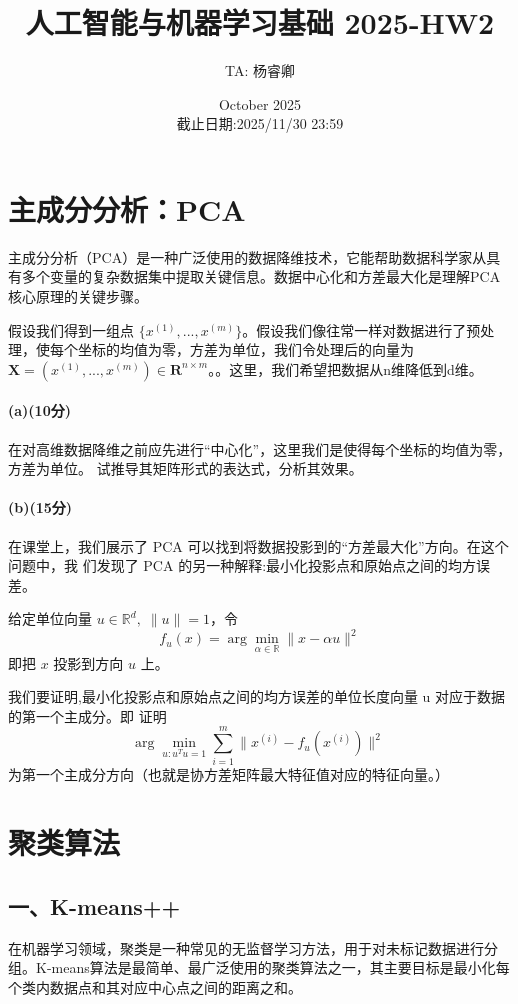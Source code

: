 \documentclass[12pt,a4paper]{article}%
\title{人工智能与机器学习基础 2025-HW2}
\author{TA: 杨睿卿}
\date{October 2025\\截止日期:2025/11/30 23:59}
\begin{document}
\maketitle
\section{主成分分析：PCA}
主成分分析（PCA）是一种广泛使用的数据降维技术，它能帮助数据科学家从具有多个变量的复杂数据集中提取关键信息。数据中心化和方差最大化是理解PCA核心原理的关键步骤。

假设我们得到一组点 $\{x^{(1)}, . . . , x^{(m)}\}$。假设我们像往常一样对数据进行了预处理，使每个坐标的均值为零，方差为单位，我们令处理后的向量为$\textbf{X}=(x^{(1)}, . . . , x^{(m)})\in \mathbf{R}^{n\times m}$。。这里，我们希望把数据从n维降低到d维。

\paragraph*{(a)(10分)}
在对高维数据降维之前应先进行“中心化”，这里我们是使得每个坐标的均值为零，方差为单位。
试推导其矩阵形式的表达式，分析其效果。

\paragraph*{(b)(15分)}
 在课堂上，我们展示了 PCA 可以找到将数据投影到的“方差最大化”方向。在这个问题中，我
们发现了 PCA 的另一种解释:最小化投影点和原始点之间的均方误差。

给定单位向量 \(u\in\mathbb{R}^{d},\;\|u\|=1\)，令  
\[
f_{u}(x)=\arg\min_{\alpha\in\mathbb{R}}\|x-\alpha u\|^{2}
\]  
即把 \(x\) 投影到方向 \(u\) 上。  

我们要证明,最小化投影点和原始点之间的均方误差的单位长度向量 u 对应于数据的第一个主成分。即
证明 
\[
\;\arg\min_{u:u^Tu=1}\sum_{i=1}^{m}\bigl\|x^{(i)}-f_{u}(x^{(i)})\bigr\|^{2}\;\;
\]  
为第一个主成分方向（也就是协方差矩阵最大特征值对应的特征向量。）

\section{聚类算法}
\subsection*{一、K-means++}
在机器学习领域，聚类是一种常见的无监督学习方法，用于对未标记数据进行分组。K-means算法是最简单、最广泛使用的聚类算法之一，其主要目标是最小化每个类内数据点和其对应中心点之间的距离之和。
\end{document}
